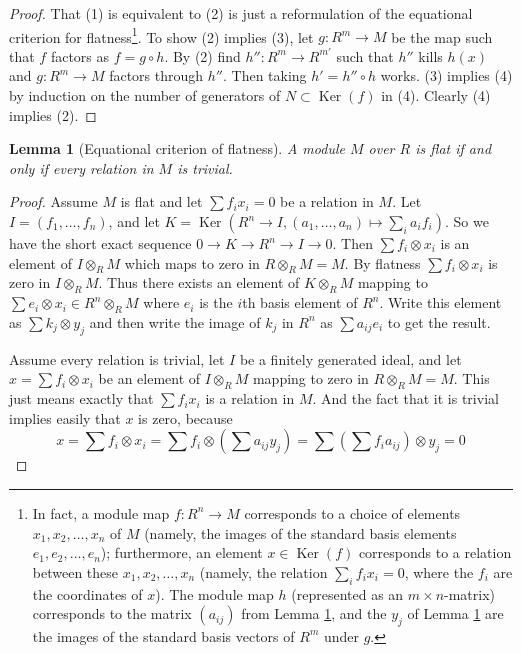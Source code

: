 \documentclass{amsart}
\theoremstyle{plain}
\newtheorem{lemma}[subsection]{Lemma}
\theoremstyle{definition}
\theoremstyle{remark}
\numberwithin{equation}{subsection}
\def\Ker{\mathop{\mathrm{Ker}}}
\begin{document}
\begin{proof}
That (1) is equivalent to (2) is just a reformulation of the equational
criterion for flatness\footnote{In fact, a module map $f : R^n \to M$
corresponds to a choice of elements $x_1, x_2, \ldots, x_n$ of $M$
(namely, the images of the standard basis elements $e_1, e_2, \ldots,
e_n$); furthermore, an element $x \in \Ker(f)$ corresponds to a
relation between these $x_1, x_2, \ldots, x_n$ (namely, the relation
$\sum_i f_i x_i = 0$, where the $f_i$ are the coordinates of $x$).
The module map $h$ (represented as an $m \times n$-matrix)
corresponds to the matrix $(a_{ij})$ from Lemma \ref{lemma-flat-eq},
and the $y_j$ of Lemma \ref{lemma-flat-eq} are the images of the
standard basis vectors of $R^m$ under $g$.}.   To show
(2) implies (3), let $g: R^m \to M$
be the map such that $f$ factors as $f = g \circ h$.  By (2) find $h'': R^m
\to R^{m'}$ such that $h''$ kills $h(x)$ and $g: R^m \to M$
factors through $h''$.  Then taking $h' = h'' \circ h$ works.  (3) implies (4)
by induction on the number of generators of $N \subset \Ker(f)$ in (4).
Clearly (4) implies (2).
\end{proof}


\begin{lemma}[Equational criterion of flatness]
\label{lemma-flat-eq}
A module $M$ over $R$ is flat if and only if
every relation in $M$ is trivial.
\end{lemma}

\begin{proof}
Assume $M$ is flat and let $\sum f_i x_i = 0$ be a relation in $M$.
Let $I = (f_1, \ldots, f_n)$, and let
$K = \Ker(R^n \to I, (a_1, \ldots, a_n) \mapsto \sum_i a_i f_i)$.
So we have the short exact sequence
$0 \to K \to R^n \to I \to 0$. Then $\sum f_i \otimes x_i$
is an element of $I \otimes_R M$ which maps
to zero in $R \otimes_R M = M$. By flatness
$\sum f_i \otimes x_i$ is zero in $I \otimes_R M$.
Thus there exists an element of $K \otimes_R M$ mapping
to $\sum e_i \otimes x_i \in R^n \otimes_R M$ where $e_i$
is the $i$th basis element of $R^n$.
Write this element as $\sum k_j \otimes y_j$
and then write the image of $k_j$ in $R^n$ as
$\sum a_{ij} e_i$ to get the result.

\medskip\noindent
Assume every relation is trivial, let $I$
be a finitely generated ideal, and let $x = \sum f_i \otimes x_i$
be an element of $I \otimes_R M$ mapping to zero in $R \otimes_R M = M$.
This just means exactly that $\sum f_i x_i$ is a relation in
$M$. And the fact that it is trivial implies easily that
$x$ is zero, because
$$
x
=
\sum f_i \otimes x_i
=
\sum f_i \otimes \left(\sum a_{ij}y_j\right)
=
\sum \left(\sum f_i a_{ij}\right) \otimes y_j
=
0
$$
\end{proof}
\end{document}
